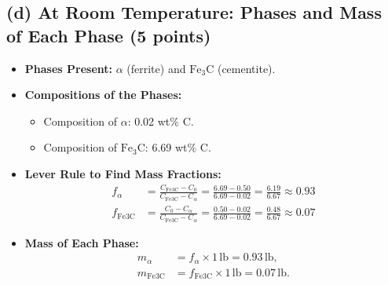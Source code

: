 \documentclass[12pt]{article}
\begin{document}
\subsection*{(d) At Room Temperature: Phases and Mass of Each Phase (5 points)}
\begin{itemize}
    \item \textbf{Phases Present:} \(\alpha\) (ferrite) and \(\text{Fe}_3\text{C}\) (cementite).
    \item \textbf{Compositions of the Phases:}
    \begin{itemize}
        \item Composition of \(\alpha\): 0.02 wt\% C.
        \item Composition of \(\text{Fe}_3\text{C}\): 6.69 wt\% C.
    \end{itemize}
    \item \textbf{Lever Rule to Find Mass Fractions:}
    \begin{align*}
        f_\alpha &= \frac{C_\text{Fe3C} - C_0}{C_\text{Fe3C} - C_\alpha} = \frac{6.69 - 0.50}{6.69 - 0.02} = \frac{6.19}{6.67} \approx 0.93 \\
        f_\text{Fe3C} &= \frac{C_0 - C_\alpha}{C_\text{Fe3C} - C_\alpha} = \frac{0.50 - 0.02}{6.69 - 0.02} = \frac{0.48}{6.67} \approx 0.07
    \end{align*}
    \item \textbf{Mass of Each Phase:}
    \begin{align*}
        m_\alpha &= f_\alpha \times 1 \, \text{lb} = 0.93 \, \text{lb}, \\
        m_\text{Fe3C} &= f_\text{Fe3C} \times 1 \, \text{lb} = 0.07 \, \text{lb}.
    \end{align*}
\end{itemize}
\end{document}
